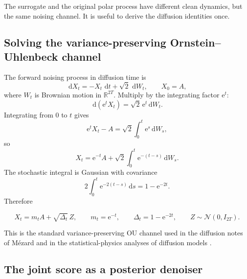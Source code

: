 \documentclass[11pt,a4paper]{article}
\newcommand{\R}{\mathbb{R}}
\newcommand{\N}{\mathcal{N}}
\newcommand{\dd}{\,\mathrm d}
\newcommand{\e}{\mathrm e}
\begin{document}
The surrogate and the original polar process have different clean dynamics, but the same noising channel. It is useful to derive the diffusion identities once.

\subsection{Solving the variance-preserving Ornstein--Uhlenbeck channel}

The forward noising process in diffusion time is
\begin{equation}
 \dd X_t=-X_t\,\dd t+\sqrt{2}\,\dd W_t,
 \qquad X_0=A,
 \label{eq:ou-sde}
\end{equation}
where $W_t$ is Brownian motion in $\R^{2T}$. Multiply by the integrating factor $\e^t$:
\[
 \dd(\e^tX_t)=\sqrt{2}\,\e^t\dd W_t.
\]
Integrating from $0$ to $t$ gives
\[
 \e^tX_t-A=\sqrt{2}\int_0^t\e^s\dd W_s,
\]
so
\begin{equation}
 X_t=\e^{-t}A+\sqrt{2}\int_0^t\e^{-(t-s)}\dd W_s.
 \label{eq:ou-integrated}
\end{equation}
The stochastic integral is Gaussian with covariance
\[
 2\int_0^t\e^{-2(t-s)}\dd s
 =1-\e^{-2t}.
\]
Therefore
\begin{keyresult}
\begin{equation}
 \boxed{
 X_t=m_tA+\sqrt{\Delta_t}\,Z,
 \qquad m_t=\e^{-t},\qquad \Delta_t=1-\e^{-2t},
 \qquad Z\sim\N(0,I_{2T}).}
 \label{eq:ou-channel}
\end{equation}
\end{keyresult}
This is the standard variance-preserving OU channel used in the diffusion notes of M\'ezard and in the statistical-physics analyses of diffusion models \cite{mezardnotes,biroli2023,biroli2024}.

\subsection{The joint score as a posterior denoiser}
\end{document}
